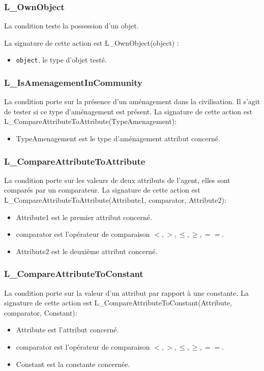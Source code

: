 \subsubsection{L\_OwnObject}

La condition teste la possession d'un objet. 

La signature de cette action est L\_OwnObject(object) :
\begin{itemize}
	\item \texttt{object},  le type d'objet testé.
	\end{itemize}	

\subsubsection{L\_IsAmenagementInCommunity}

La condition porte sur la présence d'un aménagement dans la civilisation. Il s'agit de tester si ce type d'aménagement est présent.
La signature de cette action est L\_CompareAttributeToAttribute(TypeAmenagement):
\begin{itemize}
\item TypeAmenagement est le type d'aménagement attribut concerné.
\end{itemize}


\subsubsection{L\_CompareAttributeToAttribute}

La condition porte sur les valeurs de deux attributs de l'agent, elles sont comparés par un comparateur.
La signature de cette action est L\_CompareAttributeToAttribute(Attribute1, comparator, Attribute2):
\begin{itemize}
\item Attribute1 est le premier attribut concerné.
\item comparator est l'opérateur de comparaison $<, >, \leq, \geq, == $.
\item Attribute2 est le deuxième attribut concerné.
\end{itemize}

\subsubsection{L\_CompareAttributeToConstant}

La condition porte sur la valeur d'un attribut par rapport à une constante.
La signature de cette action est L\_CompareAttributeToConstant(Attribute, comparator, Constant):
\begin{itemize}
\item Attribute est l'attribut concerné.
\item comparator est l'opérateur de comparaison $<, >, \leq, \geq, == $.
\item Constant est la constante concernée.
\end{itemize}

